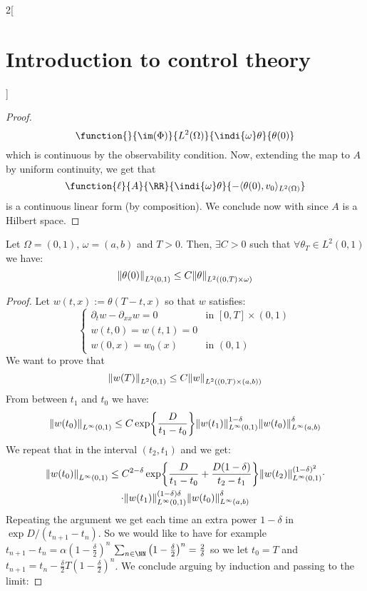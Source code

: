 \documentclass[../../../main_math.tex]{subfiles}
\begin{document}
\begin{multicols}{2}[\section{Introduction to control theory}]
\begin{proof}
    $$
      \function{}{\im(\Phi)}{L^2(\Omega)}{\indi{\omega}\theta}{\theta(0)}
    $$
    which is continuous by the observability condition. Now, extending the map to $A$ by uniform continuity, we get that
    $$
      \function{\ell}{A}{\RR}{\indi{\omega}\theta}{-\langle \theta(0),v_0\rangle_{L^2(\Omega)}}
    $$
    is a continuous linear form (by composition). We conclude now with  since $A$ is a Hilbert space.
  \end{proof}
  \begin{proposition}
    Let $\Omega=(0,1)$, $\omega=(a,b)$ and $T>0$. Then, $\exists C>0$ such that $\forall \theta_T\in L^2(0,1)$ we have:
    $$
      \norm{\theta(0)}_{L^2(0,1)}\leq C\norm{\theta}_{L^2((0,T)\times \omega)}
    $$
  \end{proposition}
  \begin{proof}
    Let $w(t,x):=\theta(T-t,x)$ so that $w$ satisfies:
    \begin{equation}\label{ICT:heat_equation_control_dual_1D}
      \begin{cases}
        \partial_t w - \partial_{xx} w = 0 & \text{in } [0,T]\times (0,1) \\
        w(t,0) = w(t,1) = 0                &                              \\
        w(0,x) = w_0(x)                    & \text{in } (0,1)
      \end{cases}
    \end{equation}
    We want to prove that $$
      \norm{w(T)}_{L^2(0,1)}\leq C\norm{w}_{L^2((0,T)\times (a,b))}
    $$
    From  between $t_1$ and $t_0$ we have:
    $$
      \norm{w(t_0)}_{L^\infty(0,1)}\leq C\exp{\frac{D}{t_1-t_0}}\norm{w(t_1)}_{L^\infty(0,1)}^{1-\delta}\norm{w(t_0)}_{L^\infty(a,b)}^\delta
    $$
    We repeat that in the interval $(t_2,t_1)$ and we get:
    \begin{multline*}
      \norm{w(t_0)}_{L^\infty(0,1)}\leq C^{2-\delta}\exp{\frac{D}{t_1-t_0}+\frac{D(1-\delta)}{t_2-t_1}}\norm{w(t_2)}_{L^\infty(0,1)}^{(1-\delta)^2}\cdot\\\cdot\norm{w(t_1)}_{L^\infty(0,1)}^{(1-\delta)\delta}\norm{w(t_0)}_{L^\infty(a,b)}^{\delta}
    \end{multline*}
    Repeating the argument we get each time an extra power $1-\delta$ in $\exp{D/(t_{n+1}-t_n)}$. So we would like to have for example $t_{n+1}-t_n=\alpha \left(1-\frac{\delta}{2}\right)^n$ $\sum_{n\in\NN} \left(1-\frac{\delta}{2}\right)^n = \frac{2}{\delta}$ so we let $t_0=T$ and $t_{n+1}=t_n-\frac{\delta}{2}T\left(1-\frac{\delta}{2}\right)^n$. We conclude arguing by induction and passing to the limit:

\end{proof}
\end{multicols}
\end{document}

